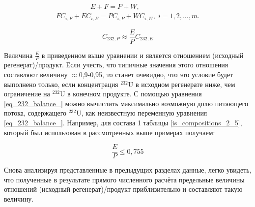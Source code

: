 \begin{equation} \label{GrindEQ__1_21__} 
  \begin{array}{l} {\quad \quad \quad \quad \quad  E+F=P+W,} \\ {FC_{i,F} + EC_{i,E} =PC_{i,P} +WC_{i,W} ,\;  i=1,2,...,m.} \end{array} 
\end{equation} 


\begin{equation}
  \label{eq_232_balance_}
    C_{232,P} \approx \frac{E}{P} C_{232,E}
  \end{equation}

Величина $\frac{E}{P}$ в приведенном выше уравнении и является отношением (исходный регенерат)/продукт. Если учесть, что типичные значения этого отношения составляют величину $\approx$0,9-0,95, то станет очевидно, что это условие будет выполнено только, если концентрация $^{232}$U в исходном регенерате ниже, чем ограничение на $^{232}$U в конечном продукте. 
С помощью уравнения \ref{eq_232_balance_} можно вычислить максимально возможную долю питающего потока, содержащего $^{232}$U, как неизвестную переменную уравнения \ref{eq_232_balance_}. Например, для состава 1 таблицы \ref{is_compositions_2_5}, который был использован в рассмотренных выше примерах получаем:



\begin{equation}
  \label{eq_232_balance_X_}
    \frac{E}{P} \leq 0,755
\end{equation}


Снова анализируя представленные в предыдущих разделах данные, легко увидеть, что полученные в результате прямого численного расчёта предельные величины отношений (исходный регенерат)/продукт приблизительно и составляют такую величину.

